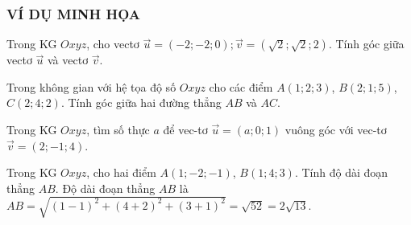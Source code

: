 \subsubsection{VÍ DỤ MINH HỌA}
\begin{vd}%
	Trong KG $Oxyz$, cho vectơ $\overrightarrow{u}=\left(-2;-2;0\right); \overrightarrow{v}=(\sqrt{2};\sqrt{2};2)$. Tính góc giữa vectơ $\overrightarrow{u}$ và vectơ $\overrightarrow{v}$.
\end{vd}
\begin{vd}%
	Trong không gian với hệ tọa độ số $ Oxyz$ cho các điểm $A\left(1; 2; 3\right)$, $B\left(2; 1; 5\right)$, $C\left(2; 4; 2\right)$. Tính góc giữa hai đường thẳng $AB$ và $AC$.
\end{vd}
\begin{vd}%
	Trong KG $Oxyz$, tìm số thực $a$ để vec-tơ $\overrightarrow{u}=(a;0;1)$ vuông góc với vec-tơ $\overrightarrow{v}=(2;-1;4)$.
\end{vd}
\begin{vd}%
	Trong KG $Oxyz$, cho hai điểm $A(1; -2; -1)$, $B(1; 4; 3)$. Tính độ dài đoạn thẳng $AB$.
	\loigiai
	{Độ dài đoạn thẳng $AB$ là $AB=\sqrt{(1-1)^2+(4+2)^2+(3+1)^2}=\sqrt{52}=2\sqrt{13}$.	
	}
\end{vd}

